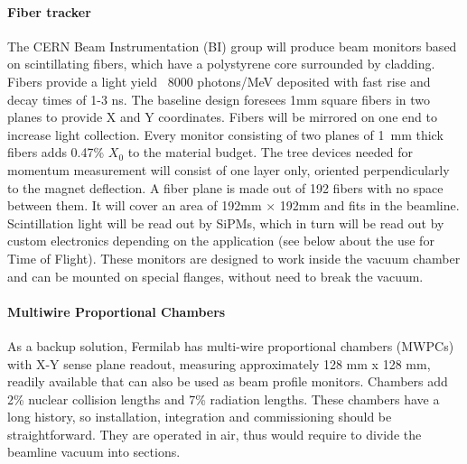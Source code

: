 \paragraph{Fiber tracker}
The CERN Beam Instrumentation (BI) group will produce
 beam monitors based on scintillating fibers, which have a polystyrene core surrounded by cladding\cite{Scifi}. Fibers provide a light yield ~8000 photons/MeV deposited with fast rise and decay times of 1-3 ns. The baseline design foresees 1mm square fibers in two planes to provide X and Y coordinates. Fibers will be mirrored on one end to increase
light collection.  Every monitor consisting of two planes of 1~mm thick fibers adds 0.47\% $X_0$ to the material budget. The tree devices needed for momentum measurement will consist of one layer only, oriented perpendicularly to the magnet deflection.
A fiber plane is made out of 192 fibers with no space between them. It will cover an area of 192mm $\times$ 192mm and fits in the beamline.
Scintillation light will be read out by SiPMs, which in turn will be read out by custom electronics depending on the application (see below about the use for Time of Flight).
%
These monitors are designed to work inside the vacuum chamber and can be mounted on special flanges, without need to break the vacuum.

\paragraph{Multiwire Proportional Chambers}
As a backup solution,
Fermilab has multi-wire proportional chambers (MWPCs) with X-Y sense plane
readout, measuring approximately 128 mm x 128 mm, readily available that can also be used as beam profile monitors. 
Chambers add 2\% nuclear collision lengths and 7\% radiation lengths.
 These chambers have a long history, so installation, integration and commissioning should be straightforward. They are operated in air, thus would require to divide the beamline vacuum into sections.


